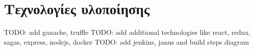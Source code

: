 \section{Τεχνολογίες υλοποίησης}

TODO: add ganache, truffle
TODO: add additional technologies like react, redux, sagas, express, nodejs, docker
TODO: add jenkins, janus and build steps diagram


